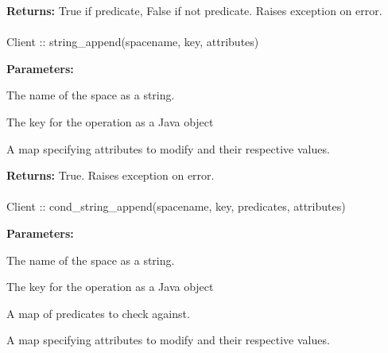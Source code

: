 \noindent\textbf{Returns:}
True if predicate, False if not predicate.  Raises exception on error.

\paragraph{}
\label{api:java:string_append}
\begin{javacode}
Client :: string_append(spacename, key, attributes)
\end{javacode}
\funcdesc 

\noindent\textbf{Parameters:}
\begin{description}[labelindent=\widthof{{\code{attributes}}},leftmargin=*,noitemsep,nolistsep,align=right]
\item[\code{spacename}] The name of the space as a string.
\item[\code{key}] The key for the operation as a Java object
\item[\code{attributes}] A map specifying attributes to modify and their respective values.
\end{description}

\noindent\textbf{Returns:}
True.  Raises exception on error.

\paragraph{}
\label{api:java:cond_string_append}
\begin{javacode}
Client :: cond_string_append(spacename, key, predicates, attributes)
\end{javacode}
\funcdesc 

\noindent\textbf{Parameters:}
\begin{description}[labelindent=\widthof{{\code{predicates}}},leftmargin=*,noitemsep,nolistsep,align=right]
\item[\code{spacename}] The name of the space as a string.
\item[\code{key}] The key for the operation as a Java object
\item[\code{predicates}] A map of predicates to check against.
\item[\code{attributes}] A map specifying attributes to modify and their respective values.
\end{description}

